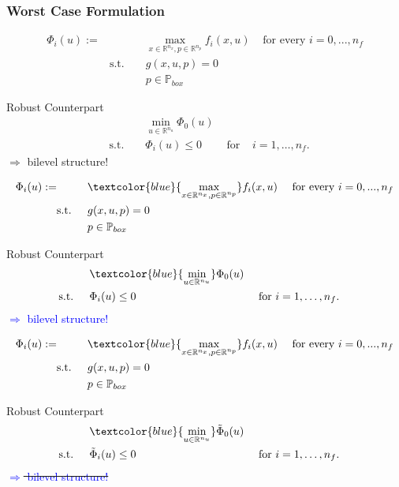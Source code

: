 \begin{frame}
\frametitle{Worst Case Formulation}
\begin{overprint}

\begin{align*}
\Phi_{i}(u):= &&& \max_{x\in \mathbb{R}^{n_{x}}, p\in \mathbb{R}^{n_{p}}} f_{i}(x,u) & \text{ for every } i=0,...,n_{f}\\
& \text{s.t. } && g(x,u,p)=0\\
&&& p\in\mathbb{P}_{box}
\end{align*}

\begin{block}{Robust Counterpart}
\begin{align*}
&&&\min_{u\in\mathbb{R}^{n_{u}}} \Phi_{0}(u)\\
&\text{s.t. } &&\Phi_{i}(u)\leq 0 & \text{ for } & i=1,\ldots,n_{f}.
\end{align*}
$\Rightarrow$ bilevel structure!
\end{block}

\begin{align*}
\Phi_{i}(u):= &&& \textcolor{blue}{\max_{x\in \mathbb{R}^{n_{x}}, p\in \mathbb{R}^{n_{p}}}} f_{i}(x,u) &  \text{ for every } i=0,...,n_{f}\\
& \text{s.t. } && g(x,u,p)=0\\
&&& p\in\mathbb{P}_{box}
\end{align*}

\begin{block}{Robust Counterpart}
	\begin{align*}
	&&&\textcolor{blue}{\min_{u\in\mathbb{R}^{n_{u}}}} \Phi_{0}(u)\\
	&\text{s.t. } &&\Phi_{i}(u)\leq 0 & \text{ for } & i=1,\ldots,n_{f}.
	\end{align*}
	\textcolor{blue}{$\Rightarrow$ bilevel structure!}
\end{block}

\begin{align*}
\Phi_{i}(u):= &&& \textcolor{blue}{\max_{x\in \mathbb{R}^{n_{x}}, p\in \mathbb{R}^{n_{p}}}} f_{i}(x,u) &  \text{ for every } i=0,...,n_{f}\\
& \text{s.t. } && g(x,u,p)=0\\
&&& p\in\mathbb{P}_{box}
\end{align*}

\begin{block}{Robust Counterpart}
	\begin{align*}
	&&&\textcolor{blue}{\min_{u\in\mathbb{R}^{n_{u}}}} \tilde{\Phi}_{0}(u)\\
	&\text{s.t. } &&\tilde{\Phi}_{i}(u)\leq 0 & \text{ for } & i=1,\ldots,n_{f}.
	\end{align*}
	\sout{\textcolor{blue}{$\Rightarrow$ bilevel structure!}}
\end{block}

\end{overprint}

\end{frame}

